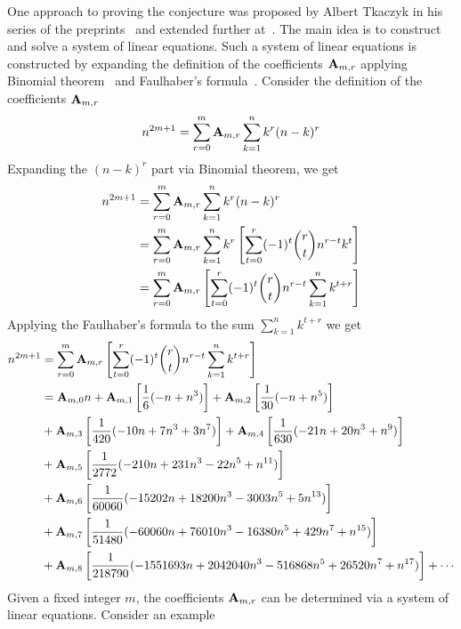 One approach to proving the conjecture was proposed by Albert Tkaczyk
in his series of the preprints~\cite{tkaczyk2018problem, tkaczyk2018continuation}
and extended further at~\cite{kolosov2022106}.
The main idea is to construct and solve a system of linear equations.
Such a system of linear equations is constructed
by expanding the definition of the coefficients ${\mathbf{A}} \sb{m,r}$
applying Binomial theorem~\cite{abramowitz1988handbook} and Faulhaber's formula~\cite{beardon1996sums}.
Consider the definition of the coefficients ${\mathbf{A}} \sb{m,r}$
\begin{equation}
    n^{2m+1} = \sum_{r=0}^{m} {\mathbf{A}} \sb{m,r} \sum_{k=1}^{n} k^{r} (n-k)^{r}\label{eq:odd-power-identity}
\end{equation}
Expanding the $(n-k)^r$ part via Binomial theorem, we get
\begin{equation*}
    \begin{split}
        n^{2m+1} &= \sum_{r=0}^{m} {\mathbf{A}} \sb{m,r} \sum_{k=1}^{n} k^{r} (n-k)^{r} \\
        &= \sum_{r=0}^{m} {\mathbf{A}} \sb{m,r} \sum_{k=1}^{n} k^{r} \left[ \sum_{t=0}^{r} (-1)^t \binom{r}{t} n^{r-t} k^{t} \right] \\
        &= \sum_{r=0}^{m} {\mathbf{A}} \sb{m,r} \left[ \sum_{t=0}^{r} (-1)^t \binom{r}{t} n^{r-t} \sum_{k=1}^{n} k^{t+r} \right] \\
    \end{split}
\end{equation*}
Applying the Faulhaber's formula to the sum $\sum_{k=1}^{n} k^{t+r}$ we get
\begin{equation}
    \begin{split}
        n^{2m+1}
        &= \sum_{r=0}^{m} {\mathbf{A}} \sb{m,r} \left[ \sum_{t=0}^{r} (-1)^t \binom{r}{t} n^{r-t} \sum_{k=1}^{n} k^{t+r} \right] \\
        &= {\mathbf{A}} \sb{m,0} n  + {\mathbf{A}} \sb{m,1} \left[ \frac{1}{6} (-n + n^3) \right] + {\mathbf{A}} \sb{m,2} \left[ \frac{1}{30} (-n + n^5) \right] \\
        &+ {\mathbf{A}} \sb{m,3} \left[ \frac{1}{420} (-10 n + 7 n^3 + 3 n^7) \right] + {\mathbf{A}} \sb{m,4} \left[ \frac{1}{630} (-21 n + 20 n^3 + n^9) \right] \\
        &+ {\mathbf{A}} \sb{m,5} \left[ \frac{1}{2772} (-210 n + 231 n^3 - 22 n^5 + n^{11}) \right] \\
        &+ {\mathbf{A}} \sb{m,6} \left[ \frac{1}{60060} (-15202 n + 18200 n^3 - 3003 n^5 + 5 n^{13}) \right] \\
        &+ {\mathbf{A}} \sb{m,7} \left[ \frac{1}{51480} (-60060 n + 76010 n^3 - 16380 n^5 + 429 n^7 + n^{15}) \right] \\
        &+ {\mathbf{A}} \sb{m,8} \left[ \frac{1}{218790} (-1551693 n + 2042040 n^3 - 516868 n^5 + 26520 n^7 + n^{17}) \right] + \cdots
    \end{split}\label{eq:arbitrary-relation}
\end{equation}
Given a fixed integer $m$, the coefficients ${\mathbf{A}} \sb{m,r}$ can be determined via a system of linear equations.
Consider an example
